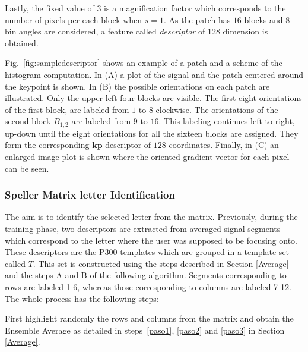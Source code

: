 \documentclass[utf8]{frontiersSCNS} %
\begin{document}
Lastly, the fixed value of $ 3 $ is a magnification factor which corresponds to the number of pixels per each block when $s = 1$.  As the patch has  $16$ blocks and  $8$ bin angles are considered, a feature called \textit{descriptor} of $128$ dimension is obtained. 

Fig.~\ref{fig:sampledescriptor} shows an example of a patch and a scheme of the histogram computation. In (A) a plot of the signal and the patch centered around the keypoint is shown. In (B) the possible orientations on each patch are illustrated.  Only the upper-left four blocks are visible.  The first eight orientations of the first block, are labeled from $1$ to $8$ clockwise. The orientations of the second block $ B_{1,2} $ are labeled from $9$ to $16$.  This labeling continues left-to-right, up-down until the eight orientations for all the sixteen blocks are assigned. They form the corresponding $\mathbf{kp}$-descriptor of $128$ coordinates. Finally, in (C) an enlarged image plot is shown where the oriented gradient vector for each pixel can be seen.
 
\subsubsection{Speller Matrix letter Identification}
\label{Classification}

The aim is to identify the selected letter from the matrix. Previously, during the training phase, two descriptors are extracted from averaged signal segments which correspond to the letter where the user was supposed to be focusing onto.  These descriptors are the P300 templates which are grouped in a template set called $ T $.  This set is constructed using the steps described in Section \ref{Average} and the steps A and B of the following algorithm.  Segments corresponding to rows are labeled 1-6, whereas those corresponding to columns are labeled 7-12.  The whole process has the following steps:

First highlight randomly the rows and columns from the matrix and obtain the Ensemble Average as detailed in steps~\ref{paso1}, \ref{paso2} and \ref{paso3} in Section \ref{Average}.
\end{document}
